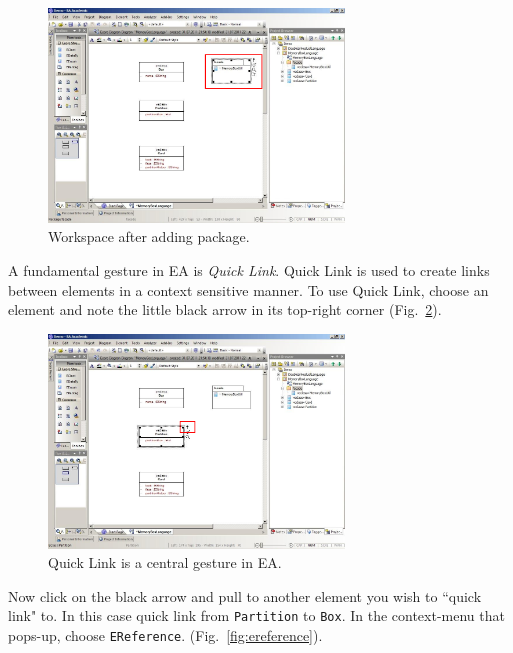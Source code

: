 \begin{figure}[htbp]
	\centering
  \includegraphics[width=0.7\textwidth]{pics/memBox22.png}
	\caption{Workspace after adding package.}
	\label{fig:epackage_completed}
\end{figure}

A fundamental gesture in EA is \emph{Quick Link}.  Quick Link is used to create
links between elements in a context sensitive manner.  To use Quick Link,
choose an element and note the little black arrow in its top-right corner
(Fig.~\ref{fig:quicklink}).

\begin{figure}[htbp]
	\centering
  \includegraphics[width=0.7\textwidth]{pics/memBox23.png}
	\caption{Quick Link is a central gesture in EA.}
	\label{fig:quicklink}
\end{figure}

\clearpage

Now click on the black arrow and pull to another element you wish to ``quick
link" to.  In this case quick link from \texttt{Partition} to \texttt{Box}.  In
the context-menu that pops-up, choose \texttt{EReference}.
(Fig.~\ref{fig:ereference}). 

